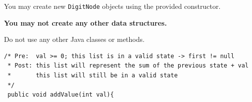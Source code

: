 \documentclass[12pt]{article}
\begin{document}
\noindent You may create new \texttt{DigitNode} objects using the provided constructor.

\noindent \textbf{You may not create any other data structures.}

\noindent Do not use any other Java classes or methods.

\clearpage
\begin{verbatim}
/* Pre:  val >= 0; this list is in a valid state -> first != null
 * Post: this list will represent the sum of the previous state + val
 *       this list will still be in a valid state
 */
 public void addValue(int val){
\end{verbatim}
\end{document}
